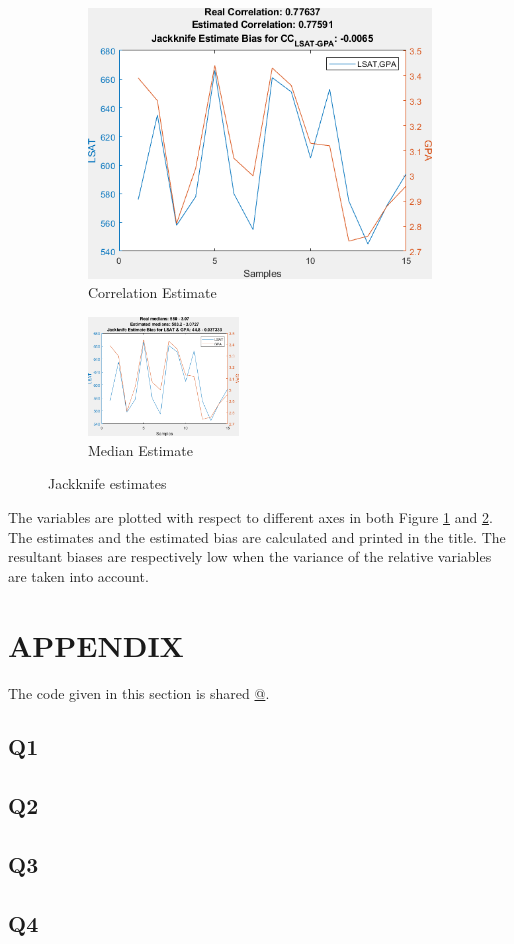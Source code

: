 \documentclass[11pt]{extarticle}
\begin{document}
\begin{figure}[h]
    \centering
    \begin{subfigure}{4cm}
        \includegraphics[width=\linewidth]{Q4_2.png}
        \caption{Correlation Estimate}\label{fig:q4a}
    \end{subfigure}
    \qquad
    \begin{subfigure}{4cm}
        \includegraphics[width=4cm]{Q4_1.png}
        \caption{Median Estimate}\label{fig:q4b}
    \end{subfigure}
    \caption{Jackknife estimates}%
    \label{fig:q4}%
\end{figure}

The variables are plotted with respect to different axes in both Figure \ref{fig:q4a} and \ref{fig:q4b}. The estimates and the estimated bias are calculated and printed in the title. The resultant biases are respectively low when the variance of the relative variables are taken into account.

\pagebreak
\section{APPENDIX}
The code given in this section is shared \href{https://github.com/kutay-ugurlu/Pattern-Recognition/tree/master/HW5}{@\faGithubSquare}.
\subsection{Q1}\label{subsec:Q1_code}

\pagebreak
\subsection{Q2} \label{subsec:Q2_code}

\pagebreak
\subsection{Q3}\label{subsec:Q3_code}

\pagebreak
\subsection{Q4}\label{subsec:Q4_code}

\end{document}
